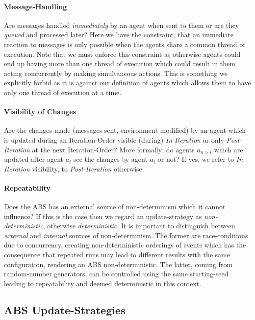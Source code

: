\paragraph{Message-Handling}
Are messages handled \textit{immediately} by an agent when sent to them or are they \textit{queued} and processed later? Here we have the constraint, that an immediate reaction to messages is only possible when the agents share a common thread of execution. Note that we must enforce this constraint as otherwise agents could end up having more than one thread of execution which could result in them acting concurrently by making simultaneous actions. This is something we explicitly forbid as it is against our definition of agents which allows them to have only one thread of execution at a time.

\paragraph{Visibility of Changes}
Are the changes made (messages sent, environment modified) by an agent which is updated during an Iteration-Order visible (during) \textit{In-Iteration} or only \textit{Post-Iteration} at the next Iteration-Order? More formally: do agents $a_{n>i}$ which are updated after agent $a_i$ see the changes by agent $a_i$ or not? If yes, we refer to \textit{In-Iteration} visibility, to \textit{Post-Iteration} otherwise.

\paragraph{Repeatability}
Does the ABS has an external source of non-determinism which it cannot influence? If this is the case then we regard an update-strategy as \textit{non-deterministic}, otherwise \textit{deterministic}. It is important to distinguish between \textit{external} and \textit{internal} sources of non-determinism. The former are race-conditions due to concurrency, creating non-deterministic orderings of events which has the consequence that repeated runs may lead to different results with the same configuration, rendering an ABS non-deterministic. The latter, coming from random-number generators, can be controlled using the same starting-seed leading to repeatability and deemed deterministic in this context. 

\subsection{ABS Update-Strategies}

